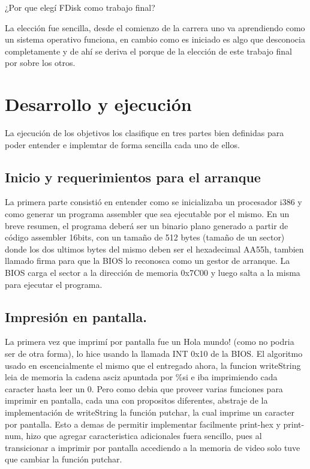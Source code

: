 \documentclass[10pt,oneside,a4paper]{article}
\begin{document}
\begin{center}
¿Por que elegí FDisk como trabajo final?
\end{center}
La elección fue sencilla, desde el comienzo de la carrera uno va aprendiendo
como un sistema operativo funciona, en cambio como es iniciado es algo
que desconocia completamente y de ahí se deriva el porque
de la elección de este trabajo final por sobre los otros.


\section{Desarrollo y ejecución}

La ejecución de los objetivos los clasifique en tres partes bien definidas para
poder entender e implemtar de forma sencilla cada uno de ellos.

\subsection{Inicio y requerimientos para el arranque}
La primera parte consistió en entender como se inicializaba un procesador i386 y
como generar un programa assembler que sea ejecutable por el mismo. En un breve
resumen, el programa deberá ser un binario plano generado a partir de código assembler
16bits, con un tamaño de 512 bytes (tamaño de un sector) donde los dos ultimos bytes del mismo
deben ser el hexadecimal AA55h,
tambien llamado firma para que la BIOS lo reconosca como un gestor de arranque.
La BIOS carga el sector a la dirección de memoria 0x7C00 y luego salta a la
misma para ejecutar el programa.
\subsection{Impresión en pantalla.}
La primera vez que imprimí por pantalla fue un Hola mundo!
(como no podria ser de otra forma),
lo hice usando la llamada  INT 0x10 de la BIOS.
El algoritmo usado en escencialmente el mismo que el entregado ahora, la
funcion writeString leia de memoria la cadena asciz apuntada por \%si e iba
imprimiendo cada caracter hasta leer un 0. Pero
como debia que proveer varias funciones para imprimir en pantalla, cada
una con propositos diferentes, abstraje de la implementación de writeString
la función putchar, la cual imprime un caracter por pantalla. Esto a demas
de permitir implementar facilmente print-hex y print-num, hizo que agregar
caracteristica adicionales fuera sencillo, pues al transicionar a imprimir
por pantalla accediendo a la memoria de video solo tuve que cambiar la
función putchar.
\end{document}
